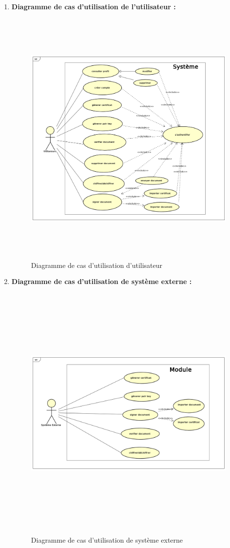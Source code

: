 \begin{enumerate}
					\item \textbf{Diagramme de cas d'utilisation de l'utilisateur :}
					\begin{figure}[H]
						\centering		
						\includegraphics[width=18cm, height=13cm]{../Diagrammes/DiagrammeDeCasDutilisation/users.png}  
						\caption{Diagramme de cas d'utilisation d'utilisateur}
						\label{diause3}
					\end{figure}
					
					\item \textbf{Diagramme de cas d'utilisation de système externe :}
						\begin{figure}[H]
							\centering		
							\includegraphics[width=18cm, height=13cm]{../Diagrammes/DiagrammeDeCasDutilisation/sysexterne.png}  
							\caption{Diagramme de cas d'utilisation de système externe}
							\label{diause4}
						\end{figure}
			

\end{enumerate}
